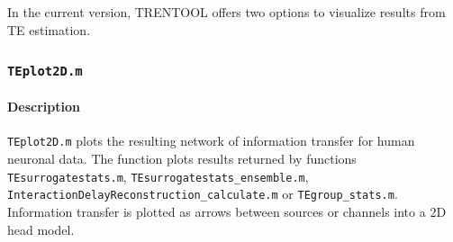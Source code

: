 \documentclass[a4paper,10pt]{article}
\begin{document}
In the current version, TRENTOOL offers two options to visualize results from TE estimation. 

% 
% 
% 
% 

\subsubsection{\texttt{TEplot2D.m}}

\paragraph*{Description} \texttt{TEplot2D.m} plots the resulting network of information transfer for human neuronal data. The function plots results returned by functions \texttt{TEsurrogatestats.m}, \texttt{TEsurrogatestats\_ensemble.m}, \texttt{InteractionDelayReconstruction\_calculate.m} or \texttt{TEgroup\_stats.m}. Information transfer is plotted as arrows between sources or channels into a 2D head model.
\end{document}
